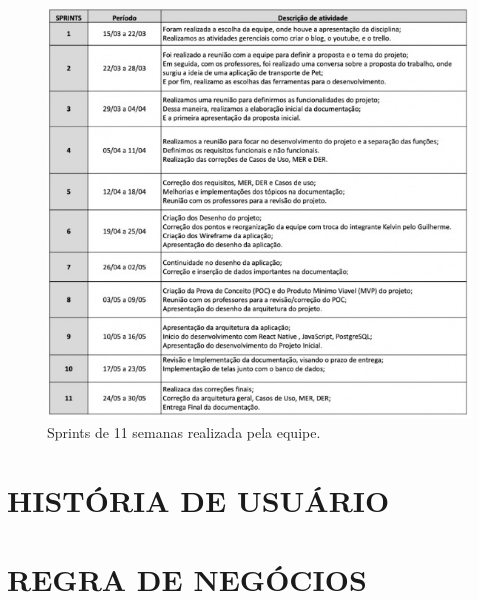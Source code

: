 \begin{apendicesenv}
\begin{figure}
    \centering
    \includegraphics{exemplos/diagramas/Sprints de 11 semanas realizada pela equipe..jpeg}
    \caption{Sprints de 11 semanas realizada pela equipe.}
    \label{fig:Sprints de 11 semanas realizada pela equipe.}
\end{figure}


\chapter{HISTÓRIA DE USUÁRIO }




\chapter{REGRA DE NEGÓCIOS}


\end{apendicesenv}
